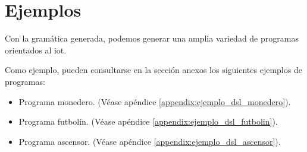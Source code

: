 \section{Ejemplos}

Con la gramática generada, podemos generar una amplia variedad de programas orientados al \gls{iot}.

Como ejemplo, pueden consultarse en la sección anexos los siguientes ejemplos de programas:

\begin{itemize}
\item Programa monedero. (Véase apéndice  \ref{appendix:ejemplo_dsl_monedero}).
\item Programa futbolín. (Véase apéndice  \ref{appendix:ejemplo_dsl_futbolin}).
\item Programa ascensor. (Véase apéndice  \ref{appendix:ejemplo_dsl_ascensor}).
\end{itemize}
